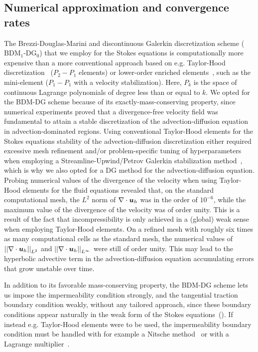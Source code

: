 \documentclass{WileyMSP-template}
\begin{document}
\subsection{Numerical approximation and convergence rates}
The Brezzi-Douglas-Marini and discontinuous Galerkin discretization scheme
($\mathrm{BDM}_1$-$\mathrm{DG}_0$) that we employ for the Stokes equations
is computationally more expensive than a more conventional approach based on
e.g. Taylor-Hood discretization~\cite{Stenberg1990ErrorProblem}
($P_2-P_1$ elements) or lower-order enriched
elements~\cite{Brezzi2011MixedMethods},
such as the mini-element ($P_1-P_1$ with a velocity stabilization).
Here, $P_k$ is the space of continuous Lagrange polynomials of degree less
than or equal to $k$.
We opted for the BDM-DG scheme because of its exactly-mass-conserving property,
since numerical experiments proved that a divergence-free velocity field was
fundamental to attain a stable discretization of the advection-diffusion equation
in advection-dominated regions. Using conventional
Taylor-Hood elements for the Stokes equations
stability of the advection-diffusion discretization either
required excessive mesh refinement and/or problem-specific tuning of
hyperparameters when employing a Streamline-Upwind/Petrov Galerkin stabilization
method~\cite{Franca1992StabilizedModel}, which is why we also opted for a DG method
for the advection-diffusion equation.
Probing numerical values of the divergence of
the velocity when using Taylor-Hood elements for the fluid equations revealed that,
on the standard computational mesh, the $L^2$ norm of $\nabla\cdot\bm{u}_h$ was
in the order of $10^{-6}$, while the
maximum value of the divergence of the velocity was of order unity. This is a result
of the fact that incompressibility is only achieved in a (global) weak sense when
employing Taylor-Hood elements. On a refined mesh with roughly six times as many
computational cells as the standard mesh, the numerical values of
${ \vert\vert\nabla\cdot\bm{u}_h\vert\vert}_{L^2}$ and ${\vert\vert\nabla\cdot\bm{u}_h\vert\vert}_{L^{\infty}}$ were still
of order unity. This may lead to the
hyperbolic advective term in the advection-diffusion equation accumulating errors
that grow unstable over time. 

In addition to its favorable mass-conserving property, the BDM-DG scheme
lets us impose the impermeability condition strongly, and the tangential
traction boundary condition weakly, without any tailored approach,
since these boundary conditions appear naturally in the weak form of the
Stokes equations~(). If instead e.g. Taylor-Hood
elements were to be used, the impermeability boundary condition must
be handled with for example a Nitsche method~\cite{Nitsche1971UberSind}
or with a Lagrange multiplier~\cite{Babuska1973TheMultipliers,
Bertoluzza2017BoundaryHemodynamics}.
\end{document}
